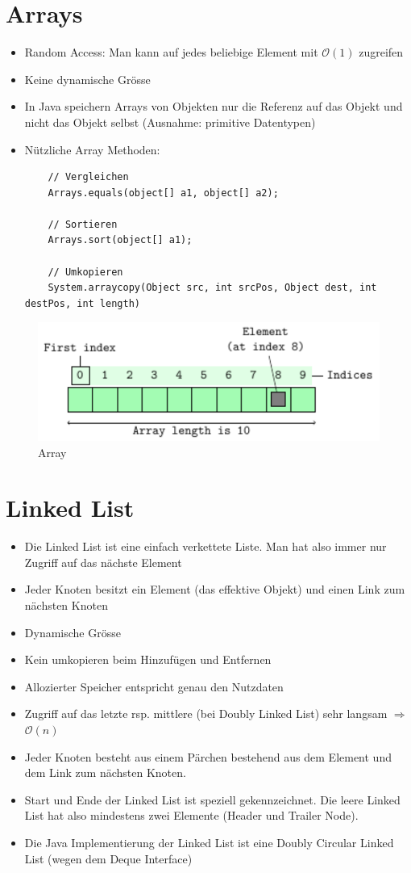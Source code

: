 \section{Arrays}
\begin{itemize}
	\item Random Access: Man kann auf jedes beliebige Element mit $\mathcal{O}(1)$ zugreifen
	\item Keine dynamische Grösse
	\item In Java speichern Arrays von Objekten nur die Referenz auf das Objekt und nicht das Objekt selbst (Ausnahme: primitive Datentypen)
	\item Nützliche Array Methoden:
	\begin{lstlisting}
	// Vergleichen
	Arrays.equals(object[] a1, object[] a2);
	
	// Sortieren
	Arrays.sort(object[] a1);
	
	// Umkopieren
	System.arraycopy(Object src, int srcPos, Object dest, int destPos, int length)
	\end{lstlisting}
\end{itemize}

\begin{figure}[h]
	\centering
	\includegraphics[width=0.7\linewidth]{images/array.pdf}
	\caption{Array}
\end{figure}

\section{Linked List}
\begin{itemize}
	\item Die Linked List ist eine einfach verkettete Liste. Man hat also immer nur Zugriff auf das nächste Element
	\item Jeder Knoten besitzt ein Element (das effektive Objekt) und einen Link zum nächsten Knoten
	\item Dynamische Grösse
	\item Kein umkopieren beim Hinzufügen und Entfernen
	\item Allozierter Speicher entspricht genau den Nutzdaten
	\item Zugriff auf das letzte rsp. mittlere (bei Doubly Linked List) sehr langsam $\Rightarrow$ $\mathcal{O}(n)$
	\item Jeder Knoten besteht aus einem Pärchen bestehend aus dem Element und dem Link zum nächsten Knoten.
	\item Start und Ende der Linked List ist speziell gekennzeichnet. Die leere Linked List hat also mindestens zwei Elemente (Header und Trailer Node). 
	\item Die Java Implementierung der Linked List ist eine Doubly Circular Linked List (wegen dem Deque Interface)
\end{itemize}

